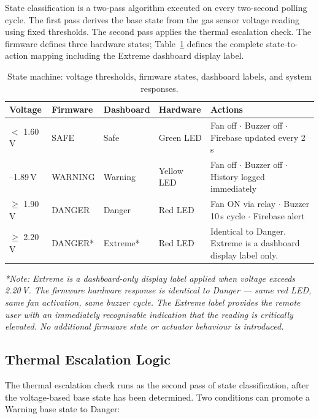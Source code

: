 \documentclass[a4paper,10pt,conference,onecolumn]{IEEEtran}
\begin{document}
State classification is a two-pass algorithm executed on every two-second
polling cycle. The first pass derives the base state from the gas sensor
voltage reading using fixed thresholds. The second pass applies the thermal
escalation check. The firmware defines three hardware states; Table~\ref{tab:states}
defines the complete state-to-action mapping including the Extreme dashboard
display label.

\begin{table}[H]
\centering
\caption{State machine: voltage thresholds, firmware states, dashboard
labels, and system responses.}
\label{tab:states}
\renewcommand{\arraystretch}{1.3}
\small
\setlength{\tabcolsep}{5pt}
\begin{tabularx}{\linewidth}{
  >{\raggedright\arraybackslash}p{2.0cm}
  >{\raggedright\arraybackslash}p{2.1cm}
  >{\raggedright\arraybackslash}p{2.1cm}
  >{\raggedright\arraybackslash}p{2.0cm}
  >{\raggedright\arraybackslash}X}
\toprule
\textbf{Voltage} & \textbf{Firmware} & \textbf{Dashboard} &
\textbf{Hardware} & \textbf{Actions} \\
\midrule
$<$ 1.60\,V & SAFE & Safe & Green LED & Fan off $\cdot$ Buzzer off $\cdot$
  Firebase updated every 2\,s \\
1.60--1.89\,V & WARNING & Warning & Yellow LED & Fan off $\cdot$ Buzzer off
  $\cdot$ History logged immediately \\
$\geq$ 1.90\,V & DANGER & Danger & Red LED & Fan ON via relay $\cdot$
  Buzzer 10\,s cycle $\cdot$ Firebase alert \\
$\geq$ 2.20\,V & DANGER* & Extreme* & Red LED & Identical to Danger.
  Extreme is a dashboard display label only. \\
\bottomrule
\end{tabularx}
\end{table}

\noindent\textit{*Note: Extreme is a dashboard-only display label applied
when voltage exceeds 2.20\,V. The firmware hardware response is identical
to Danger --- same red LED, same fan activation, same buzzer cycle. The
Extreme label provides the remote user with an immediately recognisable
indication that the reading is critically elevated. No additional firmware
state or actuator behaviour is introduced.}

\subsection{Thermal Escalation Logic}

The thermal escalation check runs as the second pass of state classification,
after the voltage-based base state has been determined. Two conditions can
promote a Warning base state to Danger:
\end{document}
